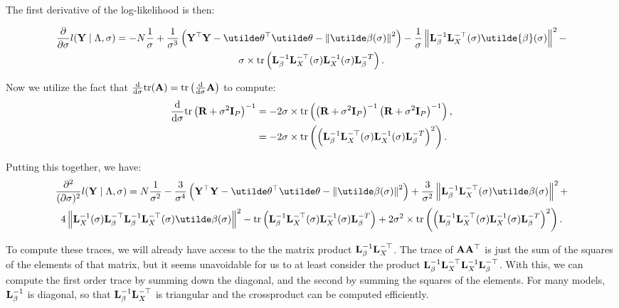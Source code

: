 \documentclass[10pt]{article}
\begin{document}
The first derivative of the log-likelihood is then:

\begin{multline*}
\frac{\partial}{\partial\sigma} l({\bf Y} \mid \Lambda,
\sigma ) = -N\frac{1}{\sigma} + \frac{1}{\sigma^3}\left({\bf Y}^\top{\bf
    Y}-\utilde\theta^\top\utilde\theta
  -\left\|\utilde\beta(\sigma)\right\|^2\right) -
\frac{1}{\sigma}\left\|{\bf L}_\beta^{-1}{\bf
  L}_X^{-\top}(\sigma)\utilde{\beta}(\sigma) \right\|^2 - \\
\sigma\times\mathrm{tr}\left({\bf
    L}_\beta^{-1}{\bf L}_X^{-\top}(\sigma){\bf L}_X^{-1}(\sigma){\bf L}_\beta^{-T}\right).
\end{multline*}

Now we utilize the fact that
$\frac{\mathrm{d}}{\mathrm{d}\sigma}\mathrm{tr}({\bf A}) =
\mathrm{tr}\left(\frac{\mathrm{d}}{\mathrm{d}\sigma} {\bf A}\right)$
to compute:
\begin{align*}
\frac{\mathrm{d}}{\mathrm{d}\sigma}\mathrm{tr} \left({\bf
    R}+\sigma^2{\bf I}_P\right)^{-1}  & =
-2\sigma\times\mathrm{tr} \left(\left({\bf R}+\sigma^2{\bf I}_P\right)^{-1}\left({\bf
      R}+\sigma^2{\bf I}_P\right)^{-1} \right), \\
& = -2\sigma\times\mathrm{tr} \left( \left({\bf
    L}_\beta^{-1}{\bf L}_X^{-\top}(\sigma){\bf L}_X^{-1}(\sigma){\bf
    L}_\beta^{-T} \right)^2  \right).
\end{align*}

Putting this together, we have:
\begin{multline*}
\frac{\partial^2}{(\partial\sigma)^2} l({\bf Y} \mid \Lambda,
\sigma ) = N \frac{1}{\sigma^2} - \frac{3}{\sigma^4} \left({\bf Y}^\top{\bf
    Y}-\utilde\theta^\top\utilde\theta
  -\left\|\utilde\beta(\sigma)\right\|^2\right) +
\frac{3}{\sigma^2}\left\| {\bf L}_\beta^{-1}{\bf
    L}_X^{-\top}(\sigma)\utilde\beta(\sigma) \right\|^2 + \\
4\left\| {\bf L}_X^{-1}(\sigma){\bf L}_\beta^{-\top} {\bf L}_\beta^{-1}{\bf
    L}_X^{-\top}(\sigma)\utilde\beta(\sigma) \right\|^2 -
\mathrm{tr}\left({\bf
    L}_\beta^{-1}{\bf L}_X^{-\top}(\sigma){\bf L}_X^{-1}(\sigma){\bf
    L}_\beta^{-T}\right) + 2\sigma^2\times\mathrm{tr}\left( \left( {\bf
    L}_\beta^{-1}{\bf L}_X^{-\top}(\sigma){\bf L}_X^{-1}(\sigma){\bf L}_\beta^{-T}\right)^2 \right).
\end{multline*}

To compute these traces, we will already have access to the the matrix
product ${\bf L}_\beta^{-1}{\bf L}_X^{-\top}$. The trace of ${\bf
  A}{\bf A}^\top$ is just the sum of the squares of the elements of
that matrix, but it seems unavoidable for us to at least consider the
product ${\bf L}_\beta^{-1}{\bf L}_X^{-\top}{\bf L}_X^{-1}{\bf
  L}_\beta^{-\top}$. With this, we can compute the first order trace
by summing down the diagonal, and the second by summing the squares of
the elements. For many models, ${\bf L}_\beta^{-1}$ is diagonal, so
that ${\bf L}_\beta^{-1}{\bf L}_X^{-\top}$ is triangular and the
crossproduct can be computed efficiently. \\
\end{document}

